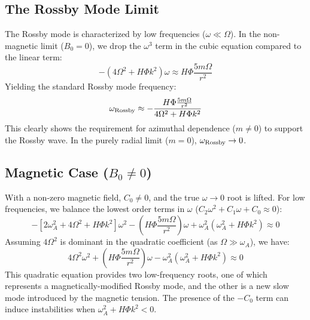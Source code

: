 \documentclass[11pt]{article}
\begin{document}
\subsection*{The Rossby Mode Limit}
The Rossby mode is characterized by low frequencies ($\omega \ll \Omega$). In the non-magnetic limit ($B_0 = 0$), we drop the $\omega^3$ term in the cubic equation compared to the linear term:
\begin{equation}
-\left( 4\Omega^2 + H\Phi k^2 \right)\omega \approx H\Phi\frac{5m\Omega}{r^2}
\end{equation}
Yielding the standard Rossby mode frequency:
\begin{equation}
\omega_{\rm Rossby} \approx - \frac{H\Phi \frac{5m\Omega}{r^2}}{4\Omega^2 + H\Phi k^2}
\end{equation}
This clearly shows the requirement for azimuthal dependence ($m \neq 0$) to support the Rossby wave. In the purely radial limit ($m=0$), $\omega_{\rm Rossby} \to 0$.

\subsection*{Magnetic Case ($B_0 \neq 0$)}
With a non-zero magnetic field, $C_0 \neq 0$, and the true $\omega \to 0$ root is lifted. For low frequencies, we balance the lowest order terms in $\omega$ ($C_2 \omega^2 + C_1 \omega + C_0 \approx 0$):
\begin{equation}
- \left[ 2\omega_A^2 + 4\Omega^2 + H\Phi k^2 \right] \omega^2 - \left( H\Phi\frac{5m\Omega}{r^2} \right) \omega + \omega_A^2 \left( \omega_A^2 + H\Phi k^2 \right) \approx 0
\end{equation}
Assuming $4\Omega^2$ is dominant in the quadratic coefficient (as $\Omega \gg \omega_A$), we have:
\begin{equation}
4\Omega^2 \omega^2 + \left( H\Phi\frac{5m\Omega}{r^2} \right) \omega - \omega_A^2 \left( \omega_A^2 + H\Phi k^2 \right) \approx 0
\end{equation}
This quadratic equation provides two low-frequency roots, one of which represents a magnetically-modified Rossby mode, and the other is a new slow mode introduced by the magnetic tension. The presence of the $-C_0$ term can induce instabilities when $\omega_A^2 + H\Phi k^2 < 0$.
\end{document}
